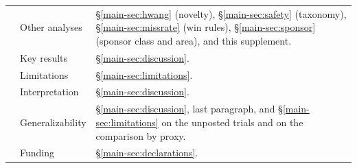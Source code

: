 \documentclass[11pt]{article}
\newcounter{strobe}
\newcommand{\strobeitem}{\stepcounter{strobe}\arabic{strobe}}
\begin{document}
\begin{table}[H]
\begin{tabular}{r>{\raggedright\arraybackslash}p{}>{\raggedright\arraybackslash}p{}}
\strobeitem & Other analyses & \S\ref{main-sec:hwang} (novelty), \S\ref{main-sec:safety} (taxonomy), \S\ref{main-sec:missrate} (win rules), \S\ref{main-sec:sponsor} (sponsor class and area), and this supplement. \\
\strobeitem & Key results & \S\ref{main-sec:discussion}. \\
\strobeitem & Limitations & \S\ref{main-sec:limitations}. \\
\strobeitem & Interpretation & \S\ref{main-sec:discussion}. \\
\strobeitem & Generalizability & \S\ref{main-sec:discussion}, last paragraph, and \S\ref{main-sec:limitations} on the unposted trials and on the comparison by proxy. \\
\strobeitem & Funding & \S\ref{main-sec:declarations}. \\
\bottomrule
\end{tabular}
\end{table}
\end{document}

